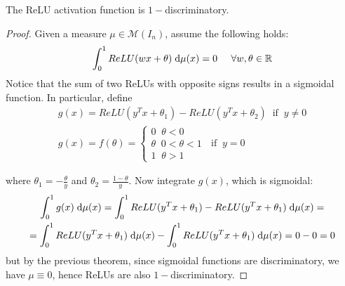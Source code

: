 \documentclass{article}
\numberwithin{equation}{subsection}
\begin{document}
\begin{theorem}
    The ReLU activation function is $1-$discriminatory.
\end{theorem}
\begin{proof}
    Given a measure $\mu \in \mathcal{M}(I_n)$, assume the following holds:
    \begin{equation*}
        \int_0^1 ReLU(wx+\theta) \;\text{d} \mu(x) = 0 \;\;\;\;\; \forall w,\theta \in \mathbb{R}
    \end{equation*}
    Notice that the sum of two ReLUs with opposite signs results in a sigmoidal function. In particular, define 
    \begin{gather*}
        g(x) = ReLU(y^Tx+\theta_1) - ReLU(y^Tx+\theta_2) \;\; \text{if} \;\; y \neq 0 \\
        g(x) = f(\theta) = \begin{cases}
            0 \;\; \theta < 0 \\
            \theta \;\; 0 < \theta < 1\\
            1 \;\; \theta > 1
        \end{cases} \;\; \text{if} \;\; y = 0
    \end{gather*}

    where $\theta_1 = -\frac{\theta}{y}$ and $\theta_2 = \frac{1-\theta}{y}$. Now integrate $g(x)$, which is sigmoidal:
    \begin{gather*}
        \int_0^1 g(x) \;\text{d} \mu(x) = \int_0^1 ReLU(y^Tx + \theta_1) - ReLU(y^Tx + \theta_1) \;\text{d} \mu(x) = \\
        = \int_0^1 ReLU(y^Tx + \theta_1) \;\text{d} \mu(x) - \int_0^1 ReLU(y^Tx + \theta_1) \;\text{d} \mu(x) = 0 - 0 = 0
    \end{gather*}
    but by the previous theorem, since sigmoidal functions are discriminatory, we have $\mu \equiv 0$, hence ReLUs are also $1-$discriminatory.
\end{proof}
\end{document}
